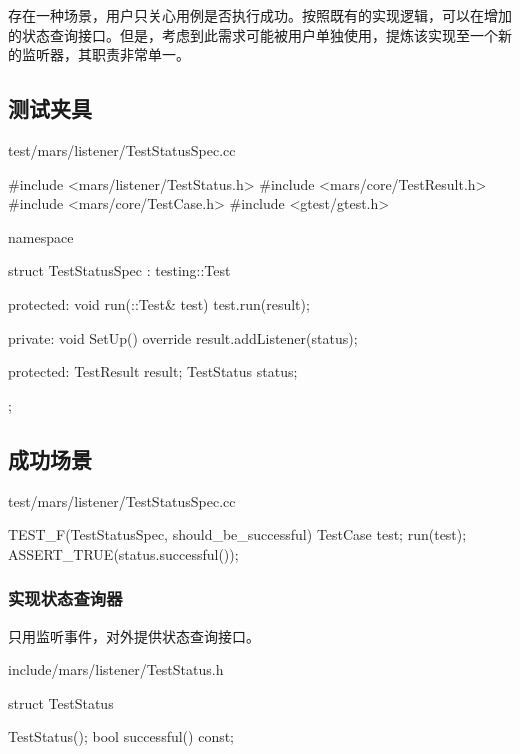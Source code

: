 \begin{content}

存在一种场景，用户只关心用例是否执行成功。按照既有的实现逻辑，可以在增加的状态查询接口。但是，考虑到此需求可能被用户单独使用，提炼该实现至一个新的监听器，其职责非常单一。

\subsection{测试夹具}

\begin{nodiff}{test/mars/listener/TestStatusSpec.cc}
 \begin{c++}
#include <mars/listener/TestStatus.h>
#include <mars/core/TestResult.h>
#include <mars/core/TestCase.h>
#include <gtest/gtest.h>

namespace {
  struct TestStatusSpec : testing::Test {
  protected:
    void run(::Test& test) {
      test.run(result);
    }

  private:
    void SetUp() override {
      result.addListener(status);
    }

  protected:
    TestResult result;
    TestStatus status;
  };
}
 \end{c++}
\end{nodiff}

\subsection{成功场景}

\begin{nodiff}{test/mars/listener/TestStatusSpec.cc}
 \begin{c++}
TEST_F(TestStatusSpec, should_be_successful) {
  TestCase test;
  run(test);
  ASSERT_TRUE(status.successful());
}
 \end{c++}
\end{nodiff}

\subsubsection{实现状态查询器}

只用监听事件，对外提供状态查询接口。

\begin{nodiff}{include/mars/listener/TestStatus.h}
 \begin{c++}
struct TestStatus {
  TestStatus();
  bool successful() const;

}
\end{c++}
\end{nodiff}
\end{content}
